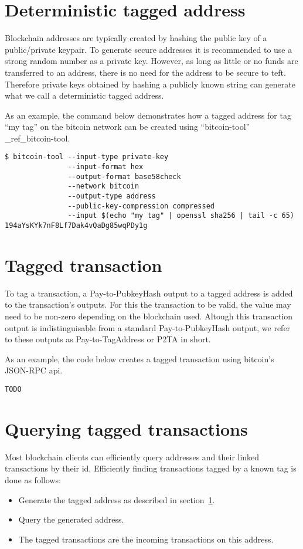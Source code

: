 \documentclass[a4paper,10pt]{article}
\begin{document}
\section{Deterministic tagged address}
\label{sec:taggedaddress}
Blockchain addresses are typically created by hashing the public key of a public/private keypair.
To generate secure addresses it is recommended to use a strong random number as a private key.
However, as long as little or no funds are transferred to an address, there is no need for the address to be secure to teft.
Therefore private keys obtained by hashing a publicly known string can generate what we call a deterministic tagged address.

As an example, the command below demonstrates how a tagged address for tag ``my tag'' on the bitcoin network can be created using ``bitcoin-tool'' \_ref\_bitcoin-tool.
\begin{verbatim}
$ bitcoin-tool --input-type private-key
               --input-format hex
               --output-format base58check
               --network bitcoin
               --output-type address
               --public-key-compression compressed
               --input $(echo "my tag" | openssl sha256 | tail -c 65)
194aYsKYk7nF8Lf7Dak4vQaDg85wqPDy1g
\end{verbatim}

\section{Tagged transaction}
To tag a transaction, a Pay-to-PubkeyHash output to a tagged address is added to the transaction's outputs.
For this the transaction to be valid, the value may need to be non-zero depending on the blockchain used.
Altough this transaction output is indistinguisable from a standard Pay-to-PubkeyHash output, we refer to these outputs as Pay-to-TagAddress or P2TA in short.

As an example, the code below creates a tagged transaction using bitcoin's JSON-RPC api.
\begin{verbatim}
TODO
\end{verbatim}


\section{Querying tagged transactions}
Most blockchain clients can efficiently query addresses and their linked transactions by their id.
Efficiently finding transactions tagged by a known tag is done as follows:
\begin{itemize}
 \item Generate the tagged address as described in section~\ref{sec:taggedaddress}.
 \item Query the generated address.
 \item The tagged transactions are the incoming transactions on this address.
\end{itemize}
\end{document}
